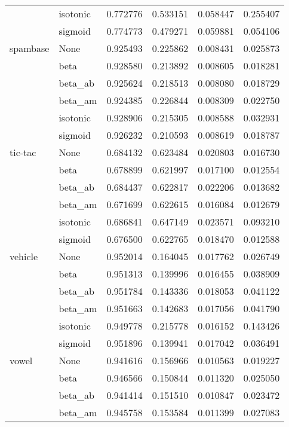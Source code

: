 \begin{tabular}{llrrrr}
        & isotonic &  0.772776 &  0.533151 &  0.058447 &  0.255407 \\
        & sigmoid &  0.774773 &  0.479271 &  0.059881 &  0.054106 \\
spambase & None &  0.925493 &  0.225862 &  0.008431 &  0.025873 \\
        & beta &  0.928580 &  0.213892 &  0.008605 &  0.018281 \\
        & beta\_ab &  0.925624 &  0.218513 &  0.008080 &  0.018729 \\
        & beta\_am &  0.924385 &  0.226844 &  0.008309 &  0.022750 \\
        & isotonic &  0.928906 &  0.215305 &  0.008588 &  0.032931 \\
        & sigmoid &  0.926232 &  0.210593 &  0.008619 &  0.018787 \\
tic-tac & None &  0.684132 &  0.623484 &  0.020803 &  0.016730 \\
        & beta &  0.678899 &  0.621997 &  0.017100 &  0.012554 \\
        & beta\_ab &  0.684437 &  0.622817 &  0.022206 &  0.013682 \\
        & beta\_am &  0.671699 &  0.622615 &  0.016084 &  0.012679 \\
        & isotonic &  0.686841 &  0.647149 &  0.023571 &  0.093210 \\
        & sigmoid &  0.676500 &  0.622765 &  0.018470 &  0.012588 \\
vehicle & None &  0.952014 &  0.164045 &  0.017762 &  0.026749 \\
        & beta &  0.951313 &  0.139996 &  0.016455 &  0.038909 \\
        & beta\_ab &  0.951784 &  0.143336 &  0.018053 &  0.041122 \\
        & beta\_am &  0.951663 &  0.142683 &  0.017056 &  0.041790 \\
        & isotonic &  0.949778 &  0.215778 &  0.016152 &  0.143426 \\
        & sigmoid &  0.951896 &  0.139941 &  0.017042 &  0.036491 \\
vowel & None &  0.941616 &  0.156966 &  0.010563 &  0.019227 \\
        & beta &  0.946566 &  0.150844 &  0.011320 &  0.025050 \\
        & beta\_ab &  0.941414 &  0.151510 &  0.010847 &  0.023472 \\
        & beta\_am &  0.945758 &  0.153584 &  0.011399 &  0.027083 \\

\end{tabular}
